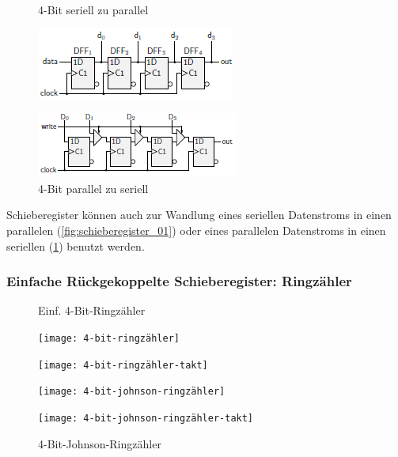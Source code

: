 \documentclass[12pt]{report}
\begin{document}
\begin{figure}[H]
  \begin{minipage}[t]{0.45\textwidth}
    \caption{4-Bit seriell zu parallel}
    \label{fig:schieberegister_01}
    \centering
    \includegraphics{schieberegister_01}
  \end{minipage}
  \hfill
  \begin{minipage}[t]{0.45\textwidth}
    \caption{4-Bit parallel zu seriell}
    \label{fig:schieberegister_02}
    \centering
    \includegraphics{schieberegister_02}
  \end{minipage}
\end{figure}

Schieberegister können auch zur Wandlung eines seriellen Datenstroms in einen parallelen (\ref{fig:schieberegister_01})
oder eines parallelen Datenstroms in einen seriellen (\ref{fig:schieberegister_02}) benutzt werden.

\subsubsection{Einfache Rückgekoppelte Schieberegister: Ringzähler}
\begin{figure}[H]
  \begin{minipage}[t]{0.45\textwidth}
    \caption{Einf. 4-Bit-Ringzähler}

    \centering
    \texttt{[image: 4-bit-ringzähler]}

    \texttt{[image: 4-bit-ringzähler-takt]}
  \end{minipage}
  \hfill
  \begin{minipage}[t]{0.45\textwidth}
    \caption{4-Bit-Johnson-Ringzähler}

    \centering
    \texttt{[image: 4-bit-johnson-ringzähler]}

    \texttt{[image: 4-bit-johnson-ringzähler-takt]}
  \end{minipage}
\end{figure}
\end{document}
